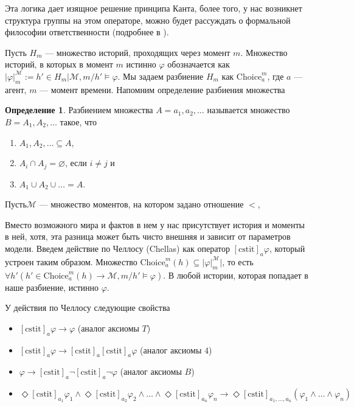 \documentclass[openany]{book}
\theoremstyle{plain}
\theoremstyle{definition}
\newtheorem{defn}{Определение}[section]
\begin{document}
Эта логика дает изящное решение принципа Канта, более того, у нас возникнет структура группы на этом операторе, можно будет рассуждать о формальной философии ответственности (подробнее в \cite{Duijf}).

Пусть \(H_m\) --- множество историй, проходящих через момент \(m\). Множество историй, в которых в момент \(m\) истинно \(\varphi\) обозначается как \(|\varphi|_m^{\mathcal{M}} := {h' \in H_m | \mathcal{M}, m/h' \models \varphi}\). Мы задаем разбиение \(H_m\) как \(\mathrm{Choice}_a^m\), где \(a\) --- агент, \(m\) --- момент времени. Напомним определение разбиения множества 
\begin{defn}
    Разбиением множества \(A = {a_1, a_2, \dots}\) называется множество \(B = {A_1, A_2, \dots}\) такое, что
    \begin{enumerate}
	\item \(A_1, A_2, \dots \subseteq A\),
	\item \(A_i \cap A_j = \varnothing\), если \(i \not= j\) и
	\item \(A_1 \cup A_2 \cup \dots = A\).
    \end{enumerate}
\end{defn}

Пусть\(\mathcal{M}\) --- множество моментов, на котором задано отношение \(<\), 

Вместо возможного мира и фактов в нем у нас присутствует история и моменты в ней, хотя, эта разница может быть чисто внешняя и зависит от параметров модели. Введем действие по Челлосу (Chellas) как оператор \([\mathrm{cstit}]_a \varphi\), который устроен таким образом. Множество \(\mathrm{Choice}_a^m (h) \subseteq |\varphi|_m^{\mathcal{M}}|\), то есть \(\forall h' (h' \in \mathrm{Choice}_a^m (h) \to \mathcal{M}, m/h' \models \varphi)\). В любой истории, которая попадает в наше разбиение, истинно \(\varphi\). 

У действия по Челлосу следующие свойства
\begin{itemize}
    \item \([\mathrm{cstit}]_a \varphi \to \varphi\) (аналог аксиомы \(T\))
    \item \([\mathrm{cstit}]_a \varphi \to [\mathrm{cstit}]_a [\mathrm{cstit}]_a \varphi\) (аналог аксиомы \(4\))
    \item \(\varphi \to  [\mathrm{cstit}]_a \neg [\mathrm{cstit}]_a \neg \varphi\) (аналог аксиомы \(B\))
    \item \(\Diamond [\mathrm{cstit}]_{a_1} \varphi_1 \land \Diamond[\mathrm{cstit}]_{a_2} \varphi_2 \land \dots \land \Diamond[\mathrm{cstit}]_{a_n} \varphi_n \to \Diamond [\mathrm{cstit}]_{a_1, \ldots, a_n} (\varphi_1 \land \dots \land \varphi_n) \)
\end{itemize}
\end{document}

